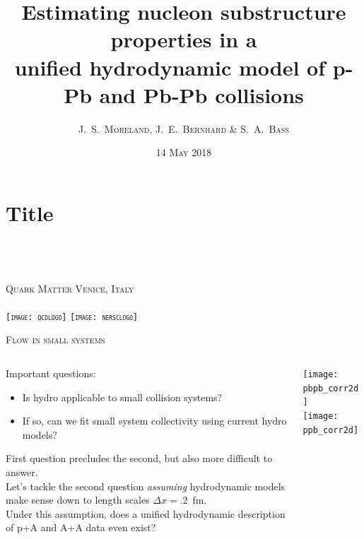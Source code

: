 \documentclass[aspectratio=169]{beamer}
\title{Estimating nucleon substructure properties in a\\[.2ex]
unified hydrodynamic model of p-Pb and Pb-Pb collisions}
\author[J.\ S.\ Moreland]{\scshape J.\ S.\ Moreland, J.\ E.\ Bernhard \& S.\ A.\ Bass}
\institute[Duke]{\scshape Duke University}
\date{\scshape 14 May 2018}
\newcommand{\conference}{\scshape Quark Matter \enskip\textbar\enskip Venice, Italy}
\begin{document}
\section{Title}

\begin{frame}
  \centering
  \textcolor{theme}{\Large \inserttitle} \\[3ex]
  \insertauthor \\
  \insertinstitute \\[2ex]
  \conference \\
  \insertdate \\[6ex]
  \texttt{[image: qcdlogo]}\quad
  \texttt{[image: nersclogo]}\\[3ex]
\end{frame}


\newcommand{\boxtitle}[1]{\textbf{#1}\\[.5ex]}

\begin{frame}{\scshape Flow in small systems}
  \smallskip
  \begin{columns}[T]
    \begin{column}{.62\textwidth}
      \bigskip
      Important questions:\\
      \begin{itemize}
        \item Is hydro applicable to small collision systems?
        \item If so, can we fit small system collectivity using current hydro models?
      \end{itemize}
      \smallskip
      First question precludes the second, but also more difficult to answer.\\[1ex]
      Let's tackle the second question \textit{assuming} hydrodynamic models make
      sense down to length scales $\Delta x=.2$~fm.\\[1ex]
      Under this assumption, does a unified hydrodynamic description of p+A and A+A data even exist?
    \end{column}
    \begin{column}{.3\textwidth}
      \centering
      \texttt{[image: pbpb\_corr2d]}\\
      \texttt{[image: ppb\_corr2d]}
    \end{column}
  \end{columns}

\end{frame}
\end{document}
